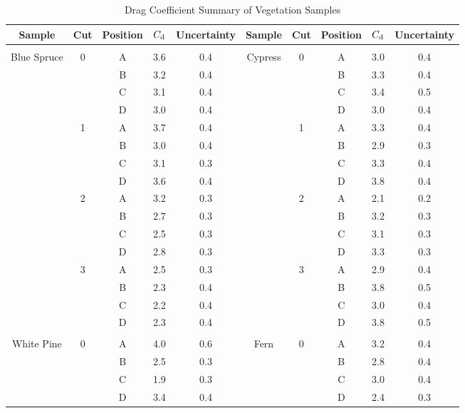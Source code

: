 \documentclass[12pt]{article}
\begin{document}
\begin{table}
\caption{Drag Coefficient Summary of Vegetation Samples}
\label{tab:SumTable}
\centering

	\footnotesize
	\begin{tabular}{cccccccccc}	
			\hline
\textbf{Sample}		&	\textbf{Cut}	&\textbf{Position}& $C_{\rm d}$ 	&\textbf{Uncertainty}	&\textbf{Sample}	&	\textbf{Cut}	&\textbf{Position}& 	\textbf{$C_{\rm d}$ }&\textbf{Uncertainty}\\
\hline
\\[0.05cm]
Blue Spruce				&	0	&	A	& 	3.6	&	0.4				& Cypress       		&	0	&	A	& 	3.0	&	0.4	\\
					&		&	B	& 	3.2	&	0.4				&				&		&	B	& 	3.3	&	0.4	\\
					&		&	C	& 	3.1	&	0.4				&				&		&	C	& 	3.4	&	0.5	\\
					&		&	D	& 	3.0	&	0.4				&				&		&	D	& 	3.0	&	0.4	\\
					&	1	&	A	& 	3.7	&	0.4				&				&	1	&	A	& 	3.3	&	0.4	\\
					&		&	B	& 	3.0	&	0.4				&				&		&	B	& 	2.9	&	0.3	\\
					&		&	C	& 	3.1	&	0.3				&				&		&	C	& 	3.3	&	0.4	\\
					&		&	D	& 	3.6	&	0.4				&				&		&	D	& 	3.8	&	0.4	\\
					&	2	&	A	& 	3.2	&	0.3				&				&	2	&	A	& 	2.1	&	0.2	\\
					&		&	B	& 	2.7	&	0.3				&				&		&	B	& 	3.2	&	0.3	\\
					&		&	C	& 	2.5	&	0.3				&				&		&	C	& 	3.1	&	0.3	\\
					&		&	D	& 	2.8	&	0.3				&				&		&	D	& 	3.3	&	0.3	\\
					&	3	&	A	& 	2.5	&	0.3				&				&	3	&	A	& 	2.9	&	0.4	\\
					&		&	B	& 	2.3	&	0.4				&				&		&	B	& 	3.8	&	0.5	\\
					&		&	C	& 	2.2	&	0.4				&				&		&	C	& 	3.0	&	0.4	\\
					&		&	D	& 	2.3	&	0.4				&				&		&	D	& 	3.8	&	0.5	\\
					&		&		& 		&					&				&		&		& 		&		\\
White Pine	       			 &	0	&	A	& 	4.0	&	0.6				& Fern	       		 &	0	&	A	& 	3.2	&	0.4	\\
					&		&	B	& 	2.5	&	0.3				&				&		&	B	& 	2.8	&	0.4	\\	
					&		&	C	& 	1.9	&	0.3				&				&		&	C	& 	3.0	&	0.4	\\
					&		&	D	& 	3.4	&	0.4				&				&		&	D	& 	2.4	&	0.3	\\

\end{tabular}
\end{table}
\end{document}
